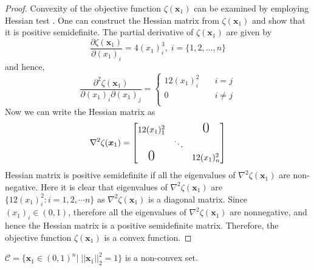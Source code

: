 \documentclass[envcountreset,oribibl]{llncs}
\begin{document}
\begin{proof}
Convexity of the objective function $\zeta({\bm{x}_1})$ can be examined by employing Hessian test \cite{nonlinear_opt_2014}. One can construct the Hessian matrix from $\zeta({\bm{x}_1})$ and show that it is positive semidefinite.
The partial derivative of $\zeta({\bm{x}_1})$ are given by 
\begin{equation}
 \frac{\partial \zeta({\bm{x}_1})}{\partial (x_1)_{i}}=4(x_1)_i^3, \; i=\{1,2,\ldots,n\} 
\end{equation}
and hence,
\begin{equation}
 \frac{\partial^2 \zeta({\bm{x}_1})}{\partial (x_1)_{i}\partial (x_1)_{j}}=
 \begin{cases}
 12(x_1)_i^2 & \quad i = j \\
 0           & \quad i \neq j\\
\end{cases}
\end{equation}
Now we can write the Hessian matrix as  
\[
  \nabla^2\zeta({\bm{x}_1}) =
   \begin{bmatrix}
    12(x_1)_1^2 & & \text{\LARGE0}\\
    & \ddots & \\
   \text{\LARGE0} & & 12(x_1)_n^2
   \end{bmatrix}
\]
Hessian matrix is positive semidefinite if all the eigenvalues of $\nabla^2\zeta({\bm{x}_1})$ are non-negative. Here it is clear that eigenvalues of $\nabla^2\zeta({\bm{x}_1})$ are $\{12 (x_1)_i^2: i = 1,2, \cdots n\}$ as $\nabla^2\zeta({\bm{x}_1})$ is a diagonal matrix.
Since $(x_1)_i \in (0,1)$, therefore all the eigenvalues of $\nabla^2\zeta({\bm{x}_1})$ are nonnegative, and hence the Hessian matrix is a positive semidefinite matrix. Therefore, the objective function $\zeta({\bm{x}_1})$ is a convex function. 
\end{proof}

\begin{lemma}
 $\mathcal{C}=\{ {\bm{x}_1} \in (0,1)^n|\;||{\bm{x}_1}||^2_2=1\}$ is a non-convex set.
\end{lemma}
\end{document}
